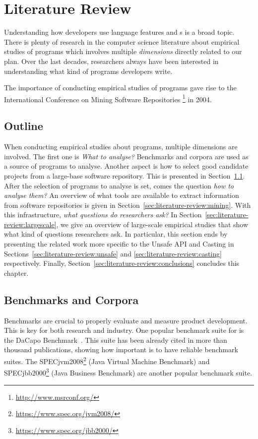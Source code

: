 \chapter{Literature Review}
\label{cha:literature-review}

Understanding how developers use language features
and \api{}s is a broad topic.
There is plenty of research in the computer science literature about
empirical studies of programs which involves multiple \emph{dimensions}
directly related to our plan.
Over the last decades,
researchers always have been interested in understanding what
kind of programs developers write.

The importance of conducting empirical studies of programs gave rise to the International Conference on Mining Software Repositories%
\footnote{\url{http://www.msrconf.org/}}
in 2004.

\section*{Outline}

When conducting empirical studies about programs,
multiple dimensions are involved.
The first one is \emph{What to analyse?}
Benchmarks and corpora are used as a source of programs to analyse.
Another aspect is how to select good candidate projects from a large-base software repository.
This is presented in Section~\ref{sec:literature-review:benchmarks}.
After the selection of programs to analyse is set,
comes the question \emph{how to analyse them?}
An overview of what tools are available to extract information from software repositories is given in Section~\ref{sec:literature-review:mining}.
With this infrastructure, \emph{what questions do researchers ask?}
In Section~\ref{sec:literature-review:largescale},
we give an overview of large-scale empirical studies that show what kind of questions researchers ask.
In particular, this section ends by presenting the related work more specific to the Unsafe API and Casting in Sections~\ref{sec:literature-review:unsafe} and \ref{sec:literature-review:casting} respectively.
Finally, Section~\ref{sec:literature-review:conclusions} concludes this chapter.

\section{Benchmarks and Corpora}
\label{sec:literature-review:benchmarks}

Benchmarks are crucial to properly evaluate and measure product development.
This is key for both research and industry.
One popular benchmark suite for \java{} is the DaCapo Benchmark~\citep{blackburnDaCapoBenchmarksJava2006}.
This suite has been already cited in more than thousand publications, showing how important is to have reliable benchmark suites.
The SPECjvm2008\footnote{\url{https://www.spec.org/jvm2008/}}
(Java Virtual Machine Benchmark)
and
SPECjbb2000\footnote{\url{https://www.spec.org/jbb2000/}}
(Java Business Benchmark)
are another popular \java{} benchmark suite.

